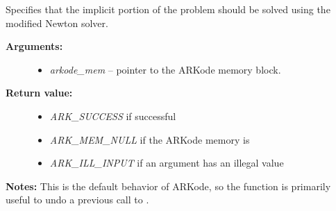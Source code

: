 \documentclass[letterpaper,10pt,english]{sphinxmanual}
\begin{document}
\begin{fulllineitems}
\label{c_interface/User_callable:ARKodeSetNewton}
Specifies that the implicit portion of the problem should be solved
using the modified Newton solver.
\begin{description}
\item[{\textbf{Arguments:}}] \leavevmode\begin{itemize}
\item {} 
\emph{arkode\_mem} -- pointer to the ARKode memory block.

\end{itemize}

\item[{\textbf{Return value:}}] \leavevmode\begin{itemize}
\item {} 
\emph{ARK\_SUCCESS} if successful

\item {} 
\emph{ARK\_MEM\_NULL} if the ARKode memory is 

\item {} 
\emph{ARK\_ILL\_INPUT} if an argument has an illegal value

\end{itemize}

\end{description}

\textbf{Notes:} This is the default behavior of ARKode, so the function
is primarily useful to undo a previous call to {\hyperref[c_interface/User_callable:ARKodeSetFixedPoint]{}}.

\end{fulllineitems}

\end{document}
